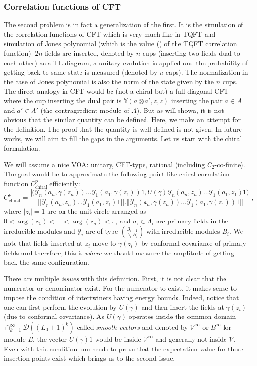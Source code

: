 \documentclass[twoside,11pt,titlepage]{amsart}
\renewcommand{\=}[1]{\stackrel{#1}{=}} %
\theoremstyle{definition}
\theoremstyle{remark}
\begin{document}
\subsubsection{Correlation functions of CFT}
\hfill \break 
The second problem is in fact a generalization of the first. It is the simulation of the correlation functions of CFT which is very much like in TQFT and simulation of Jones polynomial \cite{tqc03} (which is the value (\cite{witten1989quantum}) of the TQFT correlation function); $2n$ fields are inserted, denoted by $n$ cups (inserting two fields dual to each other) as a TL diagram, a unitary evolution is applied and the probability of getting back to same state is measured (denoted by $n$ caps). The normalization in the case of Jones polynomial is also the norm of the state given by the $n$ cups. The direct analogy in CFT would be (not a chiral but) a full diagonal CFT where the cup inserting the dual pair is $\mathbb{Y}(a\otimes a',z,\overline{z})$ inserting the pair $a \in A$ and $a' \in A'$ (the contragredient module of $A$). But as will shown, it is not obvious that the similar quantity can be defined. Here, we make an attempt for the definition. The proof that the quantity is well-defined is not given. In future works, we will aim to fill the gaps in the arguments. Let us start with the chiral formulation.

We will assume a nice VOA: unitary, CFT-type, rational (including $C_2$-co-finite). The goal would be to approximate the following point-like chiral correlation function $C_{\text{chiral}}^{p}$ efficiently:
$$C_{\text{chiral}}^{p}=\frac{|\Big(\mathscr{Y}_n(a_n,\gamma(z_n))\ldots\mathscr{Y}_1(a_1,\gamma(z_1))1,U(\gamma)\mathscr{Y}_n(a_n,z_n)\ldots\mathscr{Y}_1(a_1,z_1)1\Big)|}{||\mathscr{Y}_n(a_n,z_n)\ldots\mathscr{Y}_1(a_1,z_1)1||. ||\mathscr{Y}_n(a_n,\gamma(z_n))\ldots\mathscr{Y}_1(a_1,\gamma(z_1))1||},$$
where $|z_i|=1$ are on the unit circle arranged as $0<\arg(z_1)<\ldots<\arg(z_n)<\pi$, and $a_i\in A_i$ are primary fields in the irreducible modules and $\mathscr{Y}_i$ are of type $\binom{B_{i-1}}{A_i \ B_{i}}$ with irreducible modules $B_i$. We note that fields inserted at $z_i$ move to $\gamma(z_i)$ by conformal covariance of primary fields and therefore, this is \textit{where} we should measure the amplitude of getting back the same configuration.

There are multiple \textit{issues} with this definition. First, it is not clear that the numerator or denominator exist. For the numerator to exist, it makes sense to impose the condition of intertwiners having energy bounds. Indeed, notice that one can first perform the evolution by $U(\gamma)$ and then insert the fields at $\gamma(z_i)$ (due to conformal covariance). As $U(\gamma)$ operates inside the common domain $\cap_{k=1}^\infty \mathcal{D}((L_0+1)^k)$ called \textit{smooth vectors} and denoted by $\mathcal{V}^\infty$ or $B^\infty$ for module $B$, the vector $U(\gamma)1$ would be inside $\mathcal{V}^\infty$ and generally not inside $\mathcal{V}$. Even with this condition one needs to prove that the expectation value for those insertion points exist which brings us to the second issue.
\end{document}
